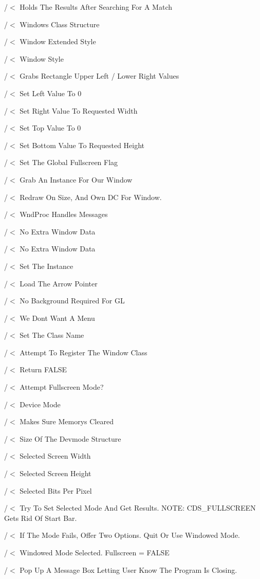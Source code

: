 /$<$ Holds The Results After Searching For A Match

/$<$ Windows Class Structure

/$<$ Window Extended Style

/$<$ Window Style

/$<$ Grabs Rectangle Upper Left / Lower Right Values

/$<$ Set Left Value To 0

/$<$ Set Right Value To Requested Width

/$<$ Set Top Value To 0

/$<$ Set Bottom Value To Requested Height

/$<$ Set The Global Fullscreen Flag

/$<$ Grab An Instance For Our Window

/$<$ Redraw On Size, And Own DC For Window.

/$<$ Wnd\+Proc Handles Messages

/$<$ No Extra Window Data

/$<$ No Extra Window Data

/$<$ Set The Instance

/$<$ Load The Arrow Pointer

/$<$ No Background Required For GL

/$<$ We Don\textquotesingle{}t Want A Menu

/$<$ Set The Class Name

/$<$ Attempt To Register The Window Class

/$<$ Return F\+A\+L\+SE

/$<$ Attempt Fullscreen Mode?

/$<$ Device Mode

/$<$ Makes Sure Memory\textquotesingle{}s Cleared

/$<$ Size Of The Devmode Structure

/$<$ Selected Screen Width

/$<$ Selected Screen Height

/$<$ Selected Bits Per Pixel

/$<$ Try To Set Selected Mode And Get Results. N\+O\+TE\+: C\+D\+S\+\_\+\+F\+U\+L\+L\+S\+C\+R\+E\+EN Gets Rid Of Start Bar.

/$<$ If The Mode Fails, Offer Two Options. Quit Or Use Windowed Mode.

/$<$ Windowed Mode Selected. Fullscreen = F\+A\+L\+SE

/$<$ Pop Up A Message Box Letting User Know The Program Is Closing.

